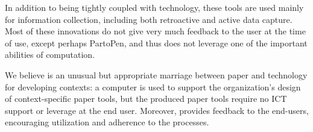 \documentclass{sig-alternate}
\begin{document}
In addition to being tightly coupled with technology, these tools are used mainly for information collection, including both retroactive and active data capture. Most of these innovations do not give very much feedback to the user at the time of use, except perhaps PartoPen, and thus does not leverage one of the important abilities of computation.

We believe \nifty is an unusual but appropriate marriage between paper and technology for developing contexts: a computer is used to support the organization's design of context-specific paper tools, but the produced paper tools require no ICT support or leverage at the end user. Moreover, \nifty provides feedback to the end-users, encouraging utilization and adherence to the processes.

\end{document}
